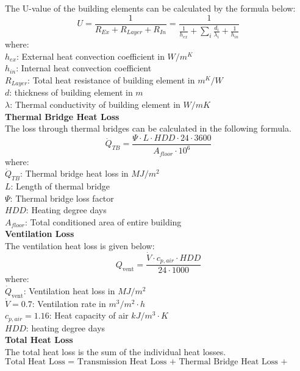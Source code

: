 \documentclass[a4paper, oneside]{discothesis}
\begin{document}
		The U-value of the building elements can be calculated by the formula below: \\
		\[U = \frac{1}{R_{Ex}+R_{Layer}+R_{In}} = \frac{1}{\frac{1}{h_{ex}}+\sum_{i}\frac{d_i}{\lambda_i} + \frac{1}{h_{in}}}\]
		where:\\
		$h_{ex}$: External heat convection coefficient in $W/m^K$\\
		$h_{in}$: Internal heat convection coefficient\\
		$R_{Layer}$: Total heat resistance of building element in $m^K/W$\\
		$d$: thickness of building element in $m$\\
		$\lambda$: Thermal conductivity of building element in $W/mK$\\


	\textbf{Thermal Bridge Heat Loss}\\
		The loss through thermal bridges can be calculated in the following formula.\\
		\[\dot{Q}_{TB} = \frac{\Psi \cdot L \cdot HDD \cdot 24 \cdot 3600}{A_{floor} \cdot 10^6}\]
		where:\\
		$\dot{Q}_{TB}$: Thermal bridge heat loss in $MJ/m^2$\\
		$L$: Length of thermal bridge\\
		$\Psi$: Thermal bridge loss factor\\ 
		$HDD$: Heating degree days\\
		$A_{floor}$: Total conditioned area of entire building\\


	\textbf{Ventilation Loss}\\
		The ventilation heat loss is given below:\\
		\[Q_{\text{vent}} = \frac{\dot{V} \cdot c_{p,air} \cdot HDD}{24 \cdot 1000}\]
		where:\\
		$\dot{Q}_{\text{vent}}$: Ventilation heat loss in $MJ/m^2$\\
		$\dot{V} = 0.7$: Ventilation rate in $m^3/m^2\cdot h$\\
		$c_{p,air} = 1.16$: Heat capacity of air $kJ/m^3 \cdot K$\\
		$HDD$: heating degree days\\
	
	\textbf{Total Heat Loss}\\
	The total heat loss is the sum of the individual heat losses.
	\[\text{Total Heat Loss = Transmission Heat Loss + Thermal Bridge Heat Loss + Ventilation Loss}\]
\end{document}
